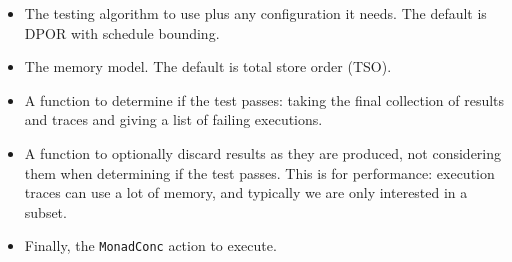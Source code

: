 \begin{itemize}
\item The testing algorithm to use plus any configuration it needs.
  The default is DPOR with schedule bounding.
\item The memory model.  The default is total store order (TSO).
\item A function to determine if the test passes: taking the final
  collection of results and traces and giving a list of failing
  executions.
\item A function to optionally discard results as they are produced,
  not considering them when determining if the test passes.  This is
  for performance: execution traces can use a lot of memory, and
  typically we are only interested in a subset.
\item Finally, the \verb|MonadConc| action to execute.
\end{itemize}

